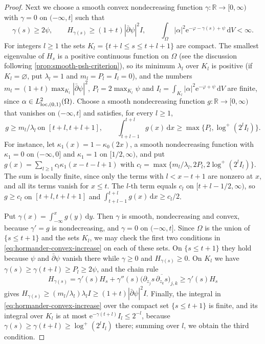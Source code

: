 \begin{proof}
Next we choose a smooth convex nondecreasing function $\gamma\colon\mathbb R\to[0,\infty)$ with $\gamma=0$ on $(-\infty,t]$ such that
\begin{equation}\label{eq:hormander-convex-increase}
 \gamma(s)\ge2\psi,\qquad
 H_{\gamma(s)}\ge(1+t)|\bar\partial\psi|^2 I,
 \qquad\int_\Omega|\alpha|^2\mathrm e^{-\varphi-\gamma(s)+\psi}\,\mathrm dV<\infty.
\end{equation}
For integers $l\ge1$ the sets $K_l=\{t+l\le s\le t+l+1\}$ are compact. The smallest eigenvalue of $H_s$ is a positive continuous function on $\Omega$ (see the discussion following \cref{prop:smooth-psh-criterion}), so its minimum $\lambda_l$ over $K_l$ is positive (if $K_l=\varnothing$, put $\lambda_l=1$ and $m_l=P_l=I_l=0$), and the numbers $m_l=(1+t)\max_{K_l}|\bar\partial\psi|^2$, $P_l=2\max_{K_l}\psi$ and $I_l=\int_{K_l}|\alpha|^2\mathrm e^{-\varphi+\psi}\,\mathrm dV$ are finite, since $\alpha\in L^2_{\mathrm{loc},(0,1)}(\Omega)$. Choose a smooth nondecreasing function $g\colon\mathbb R\to[0,\infty)$ that vanishes on $(-\infty,t]$ and satisfies, for every $l\ge1$,
\[
 g\ge m_l/\lambda_l\ \text{on }[t+l,t+l+1],\qquad
 \int_{t+l-1}^{t+l}g(x)\,\mathrm dx\ge\max\bigl\{P_l,\log^+(2^lI_l)\bigr\}.
\]
For instance, let $\kappa_1(x)=1-\kappa_0(2x)$, a smooth nondecreasing function with $\kappa_1=0$ on $(-\infty,0]$ and $\kappa_1=1$ on $[1/2,\infty)$, and put $g(x)=\sum_{l\ge1}c_l\kappa_1(x-t-l+1)$ with $c_l=\max\{m_l/\lambda_l,2P_l,2\log^+(2^lI_l)\}$. The sum is locally finite, since only the terms with $l<x-t+1$ are nonzero at $x$, and all its terms vanish for $x\le t$. The $l$-th term equals $c_l$ on $[t+l-1/2,\infty)$, so $g\ge c_l$ on $[t+l,t+l+1]$ and $\int_{t+l-1}^{t+l}g(x)\,\mathrm dx\ge c_l/2$.

Put $\gamma(x)=\int_{-\infty}^xg(y)\,\mathrm dy$. Then $\gamma$ is smooth, nondecreasing and convex, because $\gamma'=g$ is nondecreasing, and $\gamma=0$ on $(-\infty,t]$. Since $\Omega$ is the union of $\{s\le t+1\}$ and the sets $K_l$, we may check the first two conditions in \eqref{eq:hormander-convex-increase} on each of these sets. On $\{s\le t+1\}$ they hold because $\psi$ and $\bar\partial\psi$ vanish there while $\gamma\ge0$ and $H_{\gamma(s)}\ge0$. On $K_l$ we have $\gamma(s)\ge\gamma(t+l)\ge P_l\ge2\psi$, and the chain rule
\[
 H_{\gamma(s)}=\gamma'(s)H_s+\gamma''(s)\bigl(\partial_{z_j}s\,\overline{\partial_{z_k}s}\bigr)_{j,k}\ge\gamma'(s)H_s
\]
gives $H_{\gamma(s)}\ge(m_l/\lambda_l)\lambda_lI\ge(1+t)|\bar\partial\psi|^2I$. Finally, the integral in \eqref{eq:hormander-convex-increase} over the compact set $\{s\le t+1\}$ is finite, and its integral over $K_l$ is at most $\mathrm e^{-\gamma(t+l)}I_l\le2^{-l}$, because $\gamma(s)\ge\gamma(t+l)\ge\log^+(2^lI_l)$ there; summing over $l$, we obtain the third condition.


\end{proof}
